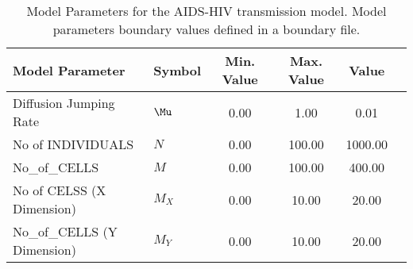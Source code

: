 \begin{table}
\centering
\begin{tabular}{p{5cm}lcccc}
{\bf Model Parameter} & {\bf Symbol} & {\bf Min. Value} & {\bf Max. Value} & {\bf Value}\\
\hline\hline
Diffusion Jumping Rate & $\Mu$ & 0.00 & 1.00 & 0.01\\
No of INDIVIDUALS & $N$ & 0.00 & 100.00 & 1000.00\\
No_of_CELLS & $M$ & 0.00 & 100.00 & 400.00\\
No of CELSS (X Dimension) & $M_X$ & 0.00 & 10.00 & 20.00\\
No_of_CELLS (Y Dimension) & $M_Y$ & 0.00 & 10.00 & 20.00\\
\hline\hline
\end{tabular}
\caption{Model Parameters for the AIDS-HIV transmission model. Model parameters boundary values defined in a boundary file.}
\end{table}
